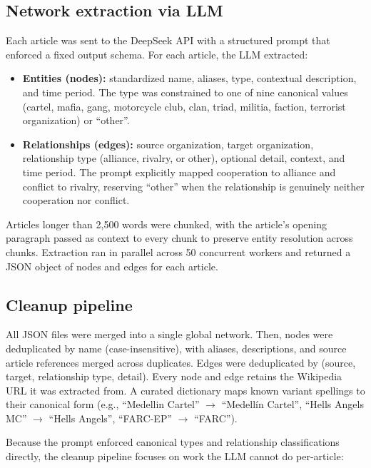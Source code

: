 \documentclass[11pt,a4paper]{article}
\begin{document}
\subsection{Network extraction via LLM}
Each article was sent to the DeepSeek API with a structured prompt that enforced a fixed output schema. For each article, the LLM extracted:
\begin{itemize}[leftmargin=2em]
  \item \textbf{Entities (nodes):} standardized name, aliases, type, contextual description, and time period. The type was constrained to one of nine canonical values (cartel, mafia, gang, motorcycle club, clan, triad, militia, faction, terrorist organization) or ``other''.
  \item \textbf{Relationships (edges):} source organization, target organization, relationship type (alliance, rivalry, or other), optional detail, context, and time period. The prompt explicitly mapped cooperation to alliance and conflict to rivalry, reserving ``other'' when the relationship is genuinely neither cooperation nor conflict.
  
\end{itemize}
Articles longer than 2{,}500 words were chunked, with the article's opening paragraph passed as context to every chunk to preserve entity resolution across chunks. Extraction ran in parallel across 50 concurrent workers and returned a JSON object of nodes and edges for each article.

\subsection{Cleanup pipeline}

All JSON files were merged into a single global network. Then, nodes were deduplicated by name (case-insensitive), with aliases, descriptions, and source article references merged across duplicates. Edges were deduplicated by (source, target, relationship type, detail). Every node and edge retains the Wikipedia URL it was extracted from. A curated dictionary maps known variant spellings to their canonical form (e.g., ``Medellin Cartel'' $\rightarrow$ ``Medell\'in Cartel'', ``Hells Angels MC'' $\rightarrow$ ``Hells Angels'', ``FARC-EP'' $\rightarrow$ ``FARC'').

Because the prompt enforced canonical types and relationship classifications directly, the cleanup pipeline focuses on work the LLM cannot do per-article:
\end{document}
